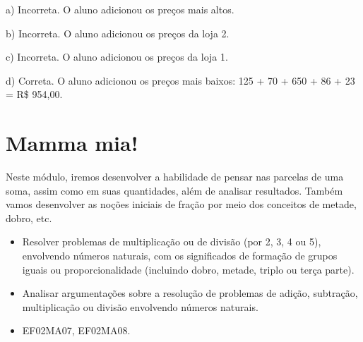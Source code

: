 {{{{{{{{{{{{{{{{{{{{a) Incorreta. O aluno adicionou os preços mais altos.

b) Incorreta. O aluno adicionou os preços da loja 2.

c) Incorreta. O aluno adicionou os preços da loja 1.

d) Correta. O aluno adicionou os preços mais baixos: 125 + 70 + 650 + 86
+ 23 = R\$ 954,00.

\chapter{Mamma mia!}

Neste módulo, iremos desenvolver a habilidade de pensar
nas parcelas de uma soma, assim como em suas quantidades, além de analisar resultados.
Também vamos desenvolver as noções iniciais de fração por meio dos
conceitos de metade, dobro, etc. 


\begin{itemize}
\item Resolver problemas de multiplicação ou de divisão (por 2, 3, 4 ou 5),
envolvendo números naturais, com os significados de formação de grupos
iguais ou proporcionalidade (incluindo dobro, metade, triplo ou terça
parte).
\item Analisar argumentações sobre a resolução de problemas de adição,
subtração, multiplicação ou divisão envolvendo números naturais.
\end{itemize}


\begin{itemize}
	\item EF02MA07, EF02MA08.
\end{itemize}

}}}}}}}}}}}}}}}}}}}}
